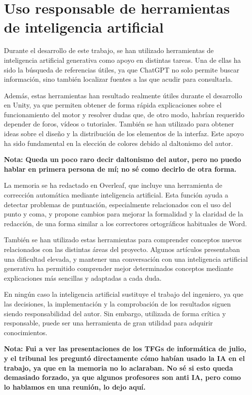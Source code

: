 \chapter{Uso responsable de herramientas de inteligencia artificial}
\label{anexo:uso_ia}

Durante el desarrollo de este trabajo, se han utilizado herramientas de inteligencia artificial generativa como apoyo en distintas tareas. Una de ellas ha sido la búsqueda de referencias útiles, ya que ChatGPT no solo permite buscar información, sino también localizar fuentes a las que acudir para consultarla.

Además, estas herramientas han resultado realmente útiles durante el desarrollo en Unity, ya que permiten obtener de forma rápida explicaciones sobre el funcionamiento del motor y resolver dudas que, de otro modo, habrían requerido depender de foros, vídeos o tutoriales. También se han utilizado para obtener ideas sobre el diseño y la distribución de los elementos de la interfaz. Este apoyo ha sido fundamental en la elección de colores debido al daltonismo del autor.

\par\medskip
\textbf{Nota: Queda un poco raro decir daltonismo del autor, pero no puedo hablar en primera persona de mí; no sé como decirlo de otra forma.}
\par\medskip

La memoria se ha redactado en Overleaf, que incluye una herramienta de corrección automática mediante inteligencia artificial. Esta función ayuda a detectar problemas de puntuación, especialmente relacionados con el uso del punto y coma, y propone cambios para mejorar la formalidad y la claridad de la redacción, de una forma similar a los correctores ortográficos habituales de Word.

También se han utilizado estas herramientas para comprender conceptos nuevos relacionados con las distintas áreas del proyecto. Algunos artículos presentaban una dificultad elevada, y mantener una conversación con una inteligencia artificial generativa ha permitido comprender mejor determinados conceptos mediante explicaciones más sencillas y adaptadas a cada duda.

En ningún caso la inteligencia artificial sustituye el trabajo del ingeniero, ya que las decisiones, la implementación y la comprobación de los resultados siguen siendo responsabilidad del autor. Sin embargo, utilizada de forma crítica y responsable, puede ser una herramienta de gran utilidad para adquirir conocimientos.


\par\medskip
\textbf{Nota: Fui a ver las presentaciones de los TFGs de informática de julio, y el tribunal les preguntó directamente cómo habían usado la IA en el trabajo, ya que en la memoria no lo aclaraban. No sé si esto queda demasiado forzado, ya que algunos profesores son anti IA, pero como lo hablamos en una reunión, lo dejo aquí.}
\par\medskip